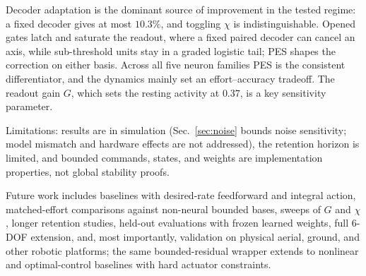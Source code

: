 \documentclass[letterpaper, 10 pt, conference]{ieeeconf}
\begin{document}
Decoder adaptation is the dominant source of improvement in the tested regime: a fixed decoder gives at most $10.3\%$, and toggling $\chi$ is indistinguishable. Opened gates latch and saturate the readout, where a fixed paired decoder can cancel an axis, while sub-threshold units stay in a graded logistic tail; PES shapes the correction on either basis. Across all five neuron families PES is the consistent differentiator, and the dynamics mainly set an effort--accuracy tradeoff. The readout gain $G$, which sets the resting activity at $0.37$, is a key sensitivity parameter.

Limitations: results are in simulation (Sec.~\ref{sec:noise} bounds noise sensitivity; model mismatch and hardware effects are not addressed), the retention horizon is limited, and bounded commands, states, and weights are implementation properties, not global stability proofs.

Future work includes baselines with desired-rate feedforward and integral action, matched-effort comparisons against non-neural bounded bases, sweeps of $G$ and $\chi$, longer retention studies, held-out evaluations with frozen learned weights, full 6-DOF extension, and, most importantly, validation on physical aerial, ground, and other robotic platforms; the same bounded-residual wrapper extends to nonlinear and optimal-control baselines with hard actuator constraints.





\end{document}
